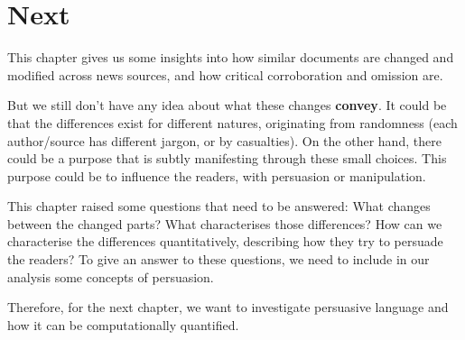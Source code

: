 \section{\statusgreen Next}
\label{sec:cgs_next}

This chapter gives us some insights into how similar documents are changed and modified across news sources, and how critical corroboration and omission are.



But we still don't have any idea about what these changes \textbf{convey}. It could be that the differences exist for different natures, originating from randomness (each author/source has different jargon, or by casualties).
On the other hand, there could be a purpose that is subtly manifesting through these small choices. This purpose could be to influence the readers, with persuasion or manipulation.

This chapter raised some questions that need to be answered:
What changes between the changed parts? What characterises those differences? How can we characterise the differences quantitatively, describing how they try to persuade the readers? To give an answer to these questions, we need to include in our analysis some concepts of persuasion.

Therefore, for the next chapter, we want to investigate persuasive language and how it can be computationally quantified. 


